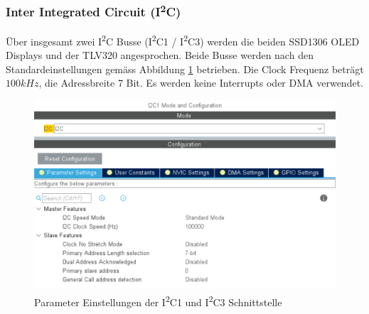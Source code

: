 \subsubsection{Inter Integrated Circuit (I\textsuperscript{2}C)}
\label{sec:CubeMXI2C}

Über insgesamt zwei I\textsuperscript{2}C Busse (I\textsuperscript{2}C1 / I\textsuperscript{2}C3) werden die beiden SSD1306 OLED Displays und der TLV320 angesprochen.
Beide Busse werden nach den Standardeinstellungen gemäss Abbildung \ref{pic:CubeMX_I2C1} betrieben.
Die Clock Frequenz beträgt $100\si{kHz}$, die Adressbreite 7 Bit.
Es werden keine Interrupts oder DMA verwendet.

\begin{figure}[H]
	\centering
	\includegraphics[width=0.9\linewidth]{../graphics/CubeMX_I2C1.png}
	\caption{Parameter Einstellungen der I\textsuperscript{2}C1 und  I\textsuperscript{2}C3 Schnittstelle}
	\label{pic:CubeMX_I2C1}
\end{figure}




